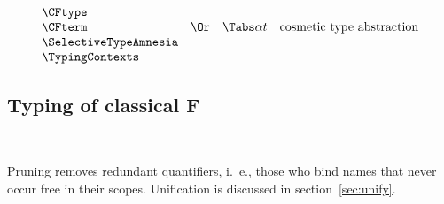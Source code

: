 \documentclass{amsart}
\begin{document}
\[
\begin{array}{lclr}
\CFtype
\\
\CFterm
&\Or& \Tabs\alpha t & \mbox{cosmetic type abstraction} \\
\SelectiveTypeAmnesia
\\
\TypingContexts
\end{array}
\]

\subsection{Typing of classical F}
~

\nc{}

\nc{}

\nc{}

\nc{}

\nc{}

\nc{}

\nc{}

\Tautology

\UniversalNegation

\ExistentialNegation

\SuperIntroduction

\SuperElimination

Pruning removes redundant quantifiers, i.~e., those who bind
names that never occur free in their scopes. Unification is
discussed in section~\ref{sec:unify}.
\end{document}
